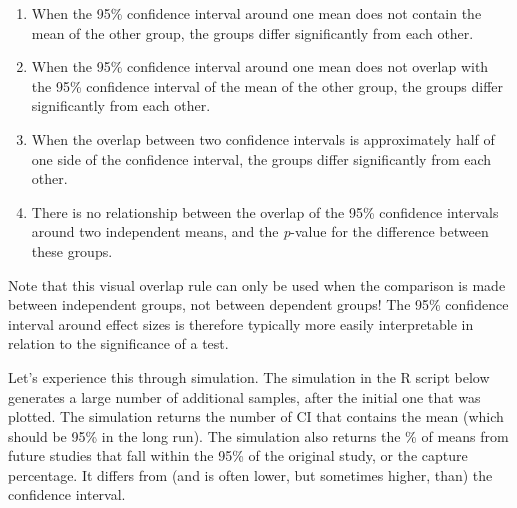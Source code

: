 \documentclass[
]{krantz}
\providecommand{\tightlist}{%
  \setlength{\itemsep}{0pt}\setlength{\parskip}{0pt}}
\begin{document}
\begin{enumerate}
\def\labelenumi{\Alph{enumi})}
\tightlist
\item
  When the 95\% confidence interval around one mean does not contain the mean of the other group, the groups differ significantly from each other.
\item
  When the 95\% confidence interval around one mean does not overlap with the 95\% confidence interval of the mean of the other group, the groups differ significantly from each other.
\item
  When the overlap between two confidence intervals is approximately half of one side of the confidence interval, the groups differ significantly from each other.
\item
  There is no relationship between the overlap of the 95\% confidence intervals around two independent means, and the \emph{p}-value for the difference between these groups.
\end{enumerate}

Note that this visual overlap rule can only be used when the comparison is made between independent groups, not between dependent groups! The 95\% confidence interval around effect sizes is therefore typically more easily interpretable in relation to the significance of a test.

Let's experience this through simulation. The simulation in the R script below generates a large number of additional samples, after the initial one that was plotted. The simulation returns the number of CI that contains the mean (which should be 95\% in the long run). The simulation also returns the \% of means from future studies that fall within the 95\% of the original study, or the capture percentage. It differs from (and is often lower, but sometimes higher, than) the confidence interval.
\end{document}
